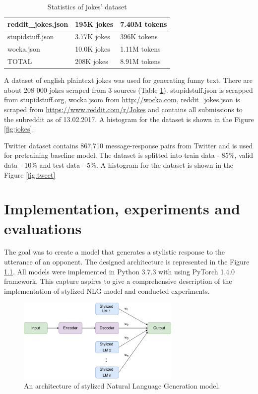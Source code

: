 \begin{table}[ht]
\centering
 \begin{tabular}{|p{4cm}|p{3cm}|p{3cm}|} 
 \hline\hline
 reddit\_jokes.json & 195K jokes & 7.40M tokens \\
 \hline
 stupidstuff.json & 3.77K jokes & 396K tokens \\
 \hline
 wocka.json & 10.0K jokes & 1.11M tokens \\
 \hline\hline
 TOTAL & 208K jokes & 8.91M tokens \\
 \hline\hline
 \end{tabular}
 \caption{Statistics of jokes' dataset}
\label{tab:jokes}
\end{table}


A dataset of english plaintext jokes was used for generating funny text. There are about 208 000 jokes scraped from 3 sources (Table \ref{tab:jokes}). stupidstuff.json is scrapped from stupidstuff.org, wocka.jsom from \url{http://wocka.com}, reddit\_jokes.json is scraped from \url{https://www.reddit.com/r/Jokes} and contains all submissions to the subreddit as of 13.02.2017. A histogram for the dataset is shown in the Figure \ref{fig:jokes}.

Twitter dataset contains 867,710 message-response pairs from Twitter and is used for pretraining baseline model. The dataset is splitted into train data - 85\%, valid data - 10\% and test data - 5\%. A histogram for the dataset is shown in the Figure \ref{fig:tweet}


\chapter{Implementation, experiments and evaluations}
The goal was to create a model that generates a stylistic response to the utterance of an opponent. The designed architecture is represented in the Figure \ref{architecture_nlg}. All models were implemented in Python 3.7.3 with using PyTorch 1.4.0 framework. This capture aspires to give a comprehensive description of the implementation of stylized NLG model and conducted experiments.

\begin{figure}[hbt]
  \centering
  \includegraphics[width=0.7\textwidth]{figures/model.pdf}
  \caption{An architecture of stylized Natural Language Generation model.}
  \label{architecture_nlg}
\end{figure}

